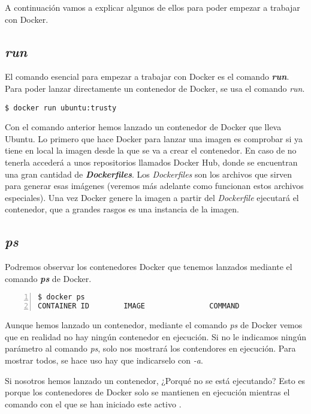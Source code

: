	A continuación vamos a explicar algunos de ellos para poder empezar a trabajar con Docker. 
	
	\subsection{\textit{run}}
	El comando esencial para empezar a trabajar con Docker es el comando \textbf{\emph{run}}. Para poder lanzar directamente un contenedor de Docker, se usa el comando \textit{run}.
	
	\begin{lstlisting}[style=consola]
$ docker run ubuntu:trusty
	\end{lstlisting}
	
	Con el comando anterior hemos lanzado un contenedor de Docker que lleva Ubuntu. Lo primero que hace Docker para lanzar una imagen es comprobar si ya tiene en local la imagen desde la que se va a crear el contenedor. En caso de no tenerla accederá a unos repositorios llamados Docker Hub, donde se encuentran una gran cantidad de \textbf{\emph{Dockerfiles}}. Los \emph{Dockerfiles} son los archivos que sirven para generar esas imágenes (veremos más adelante como funcionan estos archivos especiales). Una vez Docker genere la imagen a partir del \textit{Dockerfile} ejecutará el contenedor, que a grandes rasgos es una instancia de la imagen.
	
	\subsection{\textit{ps}}
	Podremos observar los contenedores Docker que tenemos lanzados mediante el comando \textbf{\emph{ps}} de Docker.
	
	\begin{lstlisting}[style=consola,numbers=left]
$ docker ps
CONTAINER ID        IMAGE               COMMAND                  CREATED             STATUS              PORTS               NAMES
	\end{lstlisting}
	
	Aunque hemos lanzado un contenedor, mediante el comando \emph{ps} de Docker vemos que en realidad no hay ningún contenedor en ejecución. Si no le indicamos ningún parámetro al comando \emph{ps}, solo nos mostrará los contendores en ejecución. Para mostrar todos, se hace uso hay que indicarselo con \emph{-a}.
	
	Si nosotros hemos lanzado un contenedor, ¿Porqué no se está ejecutando? Esto es porque los contenedores de Docker solo se mantienen en ejecución mientras el comando con el que se han iniciado este activo \cite{docker-run}.
	
